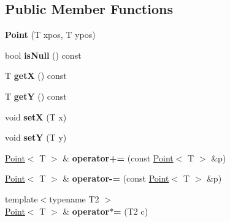 \subsection*{Public Member Functions}
\begin{DoxyCompactItemize}
\item 
\hypertarget{class_point_afee21757359d199f4c69d9701e1dc7e2}{
{\bfseries Point} (T xpos, T ypos)}
\label{class_point_afee21757359d199f4c69d9701e1dc7e2}

\item 
\hypertarget{class_point_ac9b271484c83c7e1d9a6f07ab11f3f68}{
bool {\bfseries isNull} () const }
\label{class_point_ac9b271484c83c7e1d9a6f07ab11f3f68}

\item 
\hypertarget{class_point_ae414e3bdd4f00190e7c4a999e9020f6c}{
T {\bfseries getX} () const }
\label{class_point_ae414e3bdd4f00190e7c4a999e9020f6c}

\item 
\hypertarget{class_point_a6b5641f2ef6c44b88f14276150dce919}{
T {\bfseries getY} () const }
\label{class_point_a6b5641f2ef6c44b88f14276150dce919}

\item 
\hypertarget{class_point_a0e395ed682dce1b506117001ad7b4359}{
void {\bfseries setX} (T x)}
\label{class_point_a0e395ed682dce1b506117001ad7b4359}

\item 
\hypertarget{class_point_af95aee5daa3bc93b4eb31867f4be5a2b}{
void {\bfseries setY} (T y)}
\label{class_point_af95aee5daa3bc93b4eb31867f4be5a2b}

\item 
\hypertarget{class_point_a2c82fe84181ba81c0cb13f42b2e5f8f6}{
\hyperlink{class_point}{Point}$<$ T $>$ \& {\bfseries operator+=} (const \hyperlink{class_point}{Point}$<$ T $>$ \&p)}
\label{class_point_a2c82fe84181ba81c0cb13f42b2e5f8f6}

\item 
\hypertarget{class_point_a97420680779305d8ff418154432d18e6}{
\hyperlink{class_point}{Point}$<$ T $>$ \& {\bfseries operator-\/=} (const \hyperlink{class_point}{Point}$<$ T $>$ \&p)}
\label{class_point_a97420680779305d8ff418154432d18e6}

\item 
\hypertarget{class_point_af661fc31fd0d5e68272dd0b5fd89c098}{
{\footnotesize template$<$typename T2 $>$ }\\\hyperlink{class_point}{Point}$<$ T $>$ \& {\bfseries operator$\ast$=} (T2 c)}
\label{class_point_af661fc31fd0d5e68272dd0b5fd89c098}


\end{DoxyCompactItemize}
